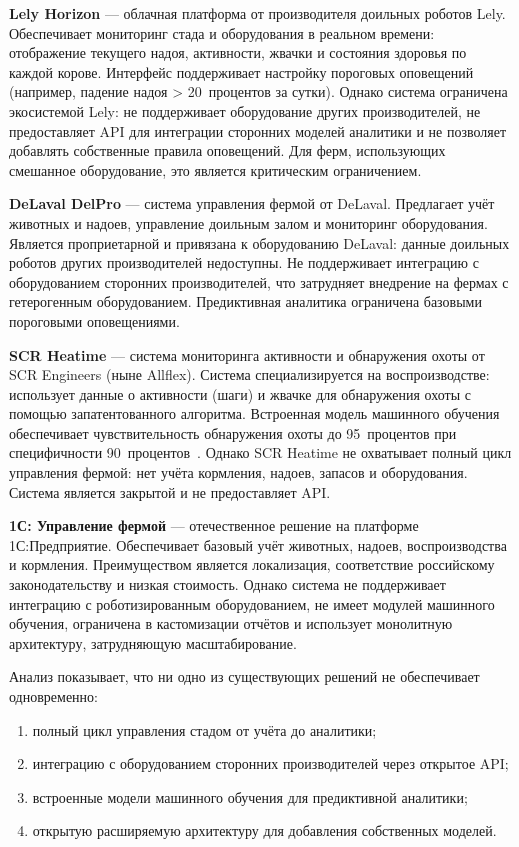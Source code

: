 \textbf{Lely Horizon} --- облачная платформа от производителя доильных роботов Lely. Обеспечивает мониторинг стада и оборудования в реальном времени: отображение текущего надоя, активности, жвачки и состояния здоровья по каждой корове. Интерфейс поддерживает настройку пороговых оповещений (например, падение надоя > 20~процентов за сутки). Однако система ограничена экосистемой Lely: не поддерживает оборудование других производителей, не предоставляет API для интеграции сторонних моделей аналитики и не позволяет добавлять собственные правила оповещений. Для ферм, использующих смешанное оборудование, это является критическим ограничением.

\textbf{DeLaval DelPro} --- система управления фермой от DeLaval. Предлагает учёт животных и надоев, управление доильным залом и мониторинг оборудования. Является проприетарной и привязана к оборудованию DeLaval: данные доильных роботов других производителей недоступны. Не поддерживает интеграцию с оборудованием сторонних производителей, что затрудняет внедрение на фермах с гетерогенным оборудованием. Предиктивная аналитика ограничена базовыми пороговыми оповещениями.

\textbf{SCR Heatime} --- система мониторинга активности и обнаружения охоты от SCR Engineers (ныне Allflex). Система специализируется на воспроизводстве: использует данные о активности (шаги) и жвачке для обнаружения охоты с помощью запатентованного алгоритма. Встроенная модель машинного обучения обеспечивает чувствительность обнаружения охоты до 95~процентов при специфичности 90~процентов~\cite{PrecisionLivestock}. Однако SCR Heatime не охватывает полный цикл управления фермой: нет учёта кормления, надоев, запасов и оборудования. Система является закрытой и не предоставляет API.

\textbf{1С: Управление фермой} --- отечественное решение на платформе 1С:Предприятие. Обеспечивает базовый учёт животных, надоев, воспроизводства и кормления. Преимуществом является локализация, соответствие российскому законодательству и низкая стоимость. Однако система не поддерживает интеграцию с роботизированным оборудованием, не имеет модулей машинного обучения, ограничена в кастомизации отчётов и использует монолитную архитектуру, затрудняющую масштабирование.

Анализ показывает, что ни одно из существующих решений не обеспечивает одновременно:
\begin{enumerate}
    \item полный цикл управления стадом от учёта до аналитики;
    \item интеграцию с оборудованием сторонних производителей через открытое API;
    \item встроенные модели машинного обучения для предиктивной аналитики;
    \item открытую расширяемую архитектуру для добавления собственных моделей.
\end{enumerate}


